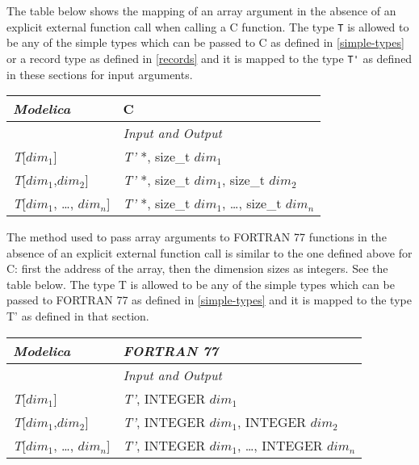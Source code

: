 The table below shows the mapping of an array argument in the absence of
an explicit external function call when calling a C function. The type \lstinline!T!
is allowed to be any of the simple types which can be passed to C as
defined in \autoref{simple-types} or a record type as defined in
\autoref{records} and it is mapped to the type \lstinline!T'! as defined in these sections
for input arguments.

\begin{longtable}[]{|l|l|}
\hline
\emph{Modelica} & C\\ \hline
& \emph{Input and Output}\\ \hline
\endhead
\emph{T}{[}$\textit{dim}_1${]} & \emph{T'} *, size\_t
$\textit{dim}_1$\\ \hline
\emph{T}{[}$\textit{dim}_1$,$\textit{dim}_2${]} &
\emph{T'} *, size\_t $\textit{dim}_1$, size\_t
$\textit{dim}_2$\\ \hline
\emph{T}{[}$\textit{dim}_1$, \ldots{},
$\textit{dim}_{n}${]} & \emph{T'} *, size\_t
$\textit{dim}_1$, \ldots{}, size\_t
$\textit{dim}_{n}$\\ \hline
\end{longtable}

The method used to pass array arguments to FORTRAN 77 functions in the
absence of an explicit external function call is similar to the one
defined above for C: first the address of the array, then the dimension
sizes as integers. See the table below. The type T is allowed to be any
of the simple types which can be passed to FORTRAN 77 as defined in
\autoref{simple-types} and it is mapped to the type T' as defined in that
section.

\begin{longtable}[]{|l|l|}
\hline
\emph{Modelica} & \emph{FORTRAN 77}\\ \hline
& \emph{Input and Output}\\ \hline
\endhead
\emph{T}{[}$\textit{dim}_1${]} & \emph{T'}, INTEGER
$\textit{dim}_1$\\ \hline
\emph{T}{[}$\textit{dim}_1$,$\textit{dim}_2${]} &
\emph{T'}, INTEGER $\textit{dim}_1$, INTEGER
$\textit{dim}_2$\\ \hline
\emph{T}{[}$\textit{dim}_1$, \ldots{},
$\textit{dim}_{n}${]} & \emph{T'}, INTEGER
$\textit{dim}_1$, \ldots{}, INTEGER
$\textit{dim}_{n}$\\ \hline

\end{longtable}


